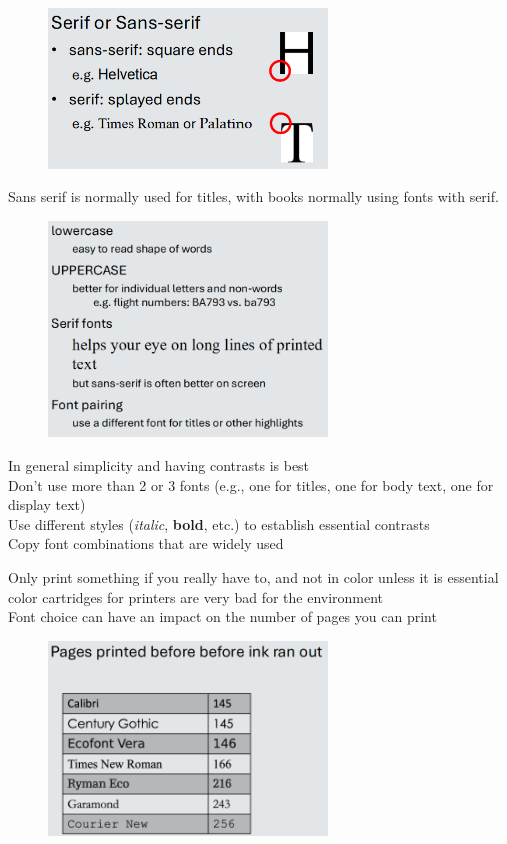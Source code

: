 \documentclass[]{project_plan}
\begin{document}
\begin{figure}[h!]
  \includegraphics[width=20em]{serif_sans_serif_fonts.png}
\end{figure}

Sans serif is normally used for titles, with books normally using fonts with serif.

\begin{figure}[h!]
  \includegraphics[width=20em]{readability_of_text.png}
\end{figure}

In general simplicity and having contrasts is best\\
Don't use more than 2 or 3 fonts (e.g., one for titles, one for body text, one for display text)\\
Use different styles (\textit{italic}, \textbf{bold}, etc.) to establish essential contrasts\\
Copy font combinations that are widely used

Only print something if you really have to, and not in color unless it is essential\\
color cartridges for printers are very bad for the environment\\
Font choice can have an impact on the number of pages you can print

\begin{figure}[ht!]
  \includegraphics[width=20em]{pages_printed_before_ink_ran_out_fonts.png}
\end{figure}
\end{document}
